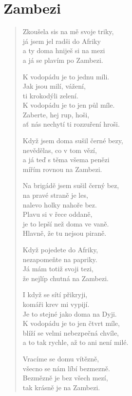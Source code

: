 \section{Zambezi}

\begin{multicols}{2}
\begin{verse}
Zkoušela sis na mě svoje triky,\\
já jsem jel radši do Afriky\\
a ty doma hniješ si na mezi\\
a já se plavím po Zambezi.

K vodopádu je to jednu míli.\\
Jak jsou milí, vážení,\\
ti krokodýli zelení.\\
K vodopádu je to jen půl míle.\\
Zaberte, hej rup, hoši,\\
ať nás nechytí ti rozzuření hroši.

Když jsem doma sušil černé bezy,\\
nevědělas, co v tom vězí,\\
a já teď s těma všema penězi\\
mířím rovnou na Zambezi.

Na brigádě jsem sušil černý bez,\\
na pravé straně je les,\\
nalevo holky nahoře bez.\\
Plavu si v řece oddaně,\\
je to lepší než doma ve vaně.\\
Hlavně, že tu nejsou piraně.

\columnbreak

Když pojedete do Afriky,\\
nezapomeňte na papriky.\\
Já mám totiž svoji tezi,\\
že nejlíp chutná na Zambezi.

I když se sítí přikryji,\\
komáři krev mi vypijí.\\
Je to stejné jako doma na Dyji.\\
K vodopádu je to jen čtvrt míle,\\
blíží se velmi nebezpečná chvíle,\\
a to tak rychle, až to ani není milé.

Vracíme se domu vítězně,\\
všecno se nám líbí bezmezně.\\
Bezmězně je bez všech mezí,\\
tak krásně je na Zambezi.

\end{verse}
\end{multicols}
